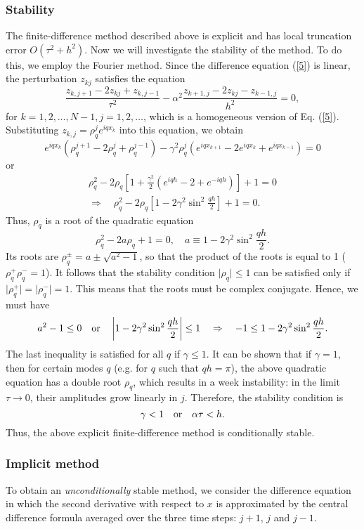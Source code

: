 \subsubsection{Stability}
The finite-difference method described
above is explicit and has local truncation error
$O(\tau^{2}+h^{2})$. Now we will investigate the stability of the
method. To do this, we employ the Fourier method. Since the
difference equation (\ref{5}) is linear, the perturbation $z_{kj}$
satisfies the equation
\[
\frac{z_{k,j+1}-2z_{kj}+z_{k,j-1}}{\tau^{2}}-\alpha^{2}
\frac{z_{k+1, j}-2z_{kj}-z_{k-1,j}}{h^{2}}=0, 
\]
for $k=1,2, \dots,N-1, j=1,2, \dots$,
which is a homogeneous version of Eq. (\ref{5}). Substituting
$z_{k,j}=\rho_{q}^{j}e^{iqx_{k}}$ into this equation, we obtain
\[
e^{iqx_{k}}\left(\rho_{q}^{j+1}-2\rho_{q}^{j}+\rho_{q}^{j-1}\right)-
\gamma^{2}\rho_{q}^{j}
\left(e^{iqx_{k+1}}-2e^{iqx_{k}}+e^{iqx_{k-1}}\right)=0
\]
or
\begin{multline*}
\rho_{q}^{2}-2\rho_{q}\left[1+
\frac{\gamma^{2}}{2}\left(e^{iqh}-2+e^{-iqh}\right)\right]+1=0\\
\Rightarrow \quad \rho_{q}^{2}-2\rho_{q}\left[1-
2\gamma^{2}\sin^{2} \frac{qh}{2}\right]+1=0.
\end{multline*}
Thus, $\rho_{q}$ is a root of the quadratic equation
\[
\rho_{q}^{2}-2a\rho_{q}+1=0, \quad a\equiv 1- 2\gamma^{2}\sin^{2}
\frac{qh}{2}.
\]
Its roots are $\rho^{\pm}_{q}=a\pm\sqrt{a^{2}-1}$, so that the
product of the roots is equal to 1 ($\rho_{q}^{+}\rho_{q}^{-}=1$).
It follows that the stability condition $\vert\rho_{q}\vert \leq
1$ can be satisfied only if $\vert\rho_{q}^{+}\vert
=\vert\rho_{q}^{-}\vert = 1$. This means that the roots must be
complex conjugate. Hence, we must have
\[
a^{2}-1\leq 0 \quad \hbox{or} \quad \left\vert 1-
2\gamma^{2}\sin^{2}\frac{qh}{2}\right\vert \leq 1  \quad
\Rightarrow \quad -1\leq 1- 2\gamma^{2}\sin^{2}\frac{qh}{2}.
\]
The last inequality is satisfied for all $q$ if $\gamma\leq 1$. It
can be shown that if $\gamma=1$, then for certain modes $q$ (e.g.
for $q$ such that $qh=\pi$), the above quadratic equation has a
double root $\rho_{q}$, which results in a week instability: in
the limit $\tau\to 0$, their amplitudes grow linearly in $j$.
Therefore, the stability condition is
\[
\gamma <1 \quad \hbox{or} \quad \alpha\tau < h.
\]
Thus, the above explicit finite-difference method is conditionally
stable.


\subsubsection{Implicit method}
To obtain an {\it unconditionally} stable
method, we consider the difference equation in which the second
derivative with respect to $x$ is approximated by the central
difference formula averaged over the three time steps: $j+1$, $j$
and $j-1$.

